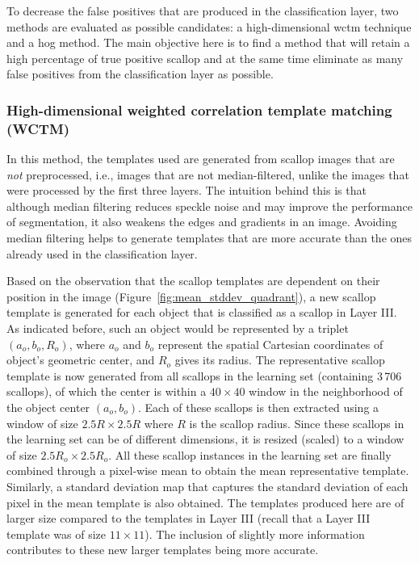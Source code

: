 To decrease the false positives that are produced in the classification layer, two methods are evaluated as possible candidates: a high-dimensional \gls{wctm} technique and a \gls{hog} method. 
The main objective here is to find a method that will retain a high percentage of true positive scallop and at the same time eliminate as many false positives from the classification layer as possible.

\subsubsection{High-dimensional weighted correlation template matching (WCTM)}
In this method, the templates used are generated from scallop images that are \emph{not} preprocessed, i.e., images that are not median-filtered, unlike the images that were processed by the first three layers. 
The intuition behind this is that although median filtering reduces speckle noise and may improve the performance of segmentation, it also weakens the edges and gradients in an image. 
Avoiding median filtering helps to generate templates that are more accurate than the ones already used in the classification layer.

Based on the observation that the scallop templates are dependent on their position in the image (Figure~\ref{fig:mean_stddev_quadrant}), a new scallop template is generated for each object that is classified as a scallop in Layer III. 
As indicated before, such an object would be represented by a triplet $(a_o,b_o,R_o)$, where $a_o$ and $b_o$ represent the spatial Cartesian coordinates of object's geometric center, and $R_o$ gives its radius. 
The representative scallop template is now generated from all scallops in the learning set (containing 3\,706 scallops), of which the center is within a $40\times40$ window in the neighborhood of the object center $(a_o,b_o)$. 
Each of these scallops is then extracted using a window of size $2.5R\times2.5R$ where $R$ is the scallop radius. 
Since these scallops in the learning set can be of different dimensions, it is resized (scaled) to a window of size $2.5R_o\times2.5R_o$. 
All these scallop instances in the learning set are finally combined through a pixel-wise mean to obtain the mean representative template. 
Similarly, a standard deviation map that captures the standard deviation of each pixel in the mean template is also obtained.  
The templates produced here are of larger size compared to the templates in Layer III (recall that a Layer III template was of size $11\times11$).
The inclusion of slightly more information contributes to these new larger templates being more accurate.

